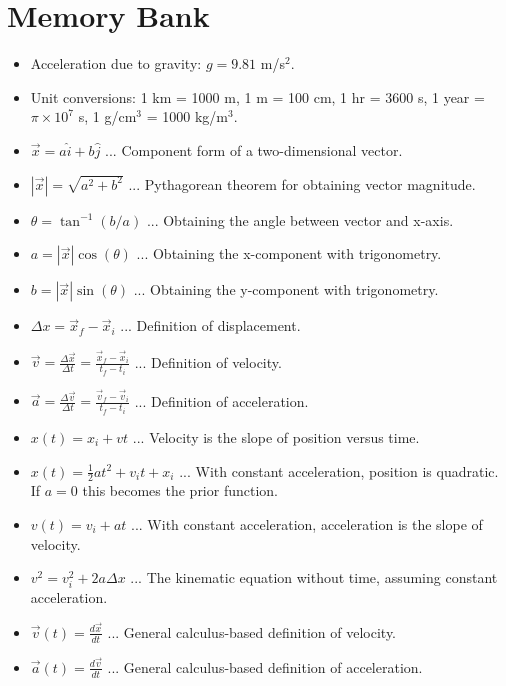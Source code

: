 \documentclass[10pt]{article}
\begin{document}
\maketitle

\section{Memory Bank}

\begin{itemize}
\item Acceleration due to gravity: $g = 9.81$ m/s$^2$.
\item Unit conversions: 1 km = 1000 m, 1 m = 100 cm, 1 hr = 3600 s, 1 year = $\pi \times 10^7$ s, 1 g/cm$^3$ = 1000 kg/m$^3$.
\item $\vec{x} = a \hat{i} + b\hat{j}$ ... Component form of a two-dimensional vector.
\item $|\vec{x}| = \sqrt{a^2+b^2}$ ... Pythagorean theorem for obtaining vector magnitude.
\item $\theta = \tan^{-1}(b/a)$ ... Obtaining the angle between vector and x-axis.
\item $a = |\vec{x}|\cos(\theta)$ ... Obtaining the x-component with trigonometry.
\item $b = |\vec{x}|\sin(\theta)$ ... Obtaining the y-component with trigonometry.
\item $\Delta x = \vec{x}_f - \vec{x}_i$ ... Definition of displacement.
\item $\vec{v} = \frac{\Delta \vec{x}}{\Delta t} = \frac{\vec{x}_f - \vec{x}_i}{t_f-t_i}$ ... Definition of velocity.
\item $\vec{a} = \frac{\Delta \vec{v}}{\Delta t} = \frac{\vec{v}_f - \vec{v}_i}{t_f-t_i}$ ... Definition of acceleration.
\item $x(t) = x_i + v t$ ... Velocity is the slope of position versus time.
\item $x(t) = \frac{1}{2} a t^2 + v_i t + x_i$ ... With constant acceleration, position is quadratic.  If $a=0$ this becomes the prior function.
\item $v(t) = v_i + a t$ ... With constant acceleration, acceleration is the slope of velocity.
\item $v^2 = v_i^2 + 2 a \Delta x$ ... The kinematic equation without time, assuming constant acceleration.
\item $\vec{v}(t) = \frac{d\vec{x}}{dt}$ ... General calculus-based definition of velocity.
\item $\vec{a}(t) = \frac{d\vec{v}}{dt}$ ... General calculus-based definition of acceleration.

\end{itemize}
\end{document}

